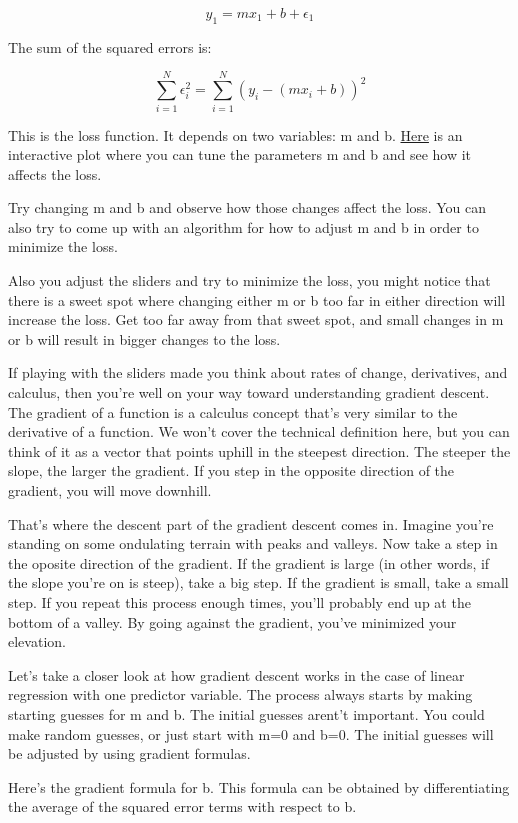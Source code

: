 \documentclass[11pt]{article}
\begin{document}
$$
y_1 = mx_1 + b + \epsilon_1
$$

The sum of the squared errors is:

$$
\sum_{i=1}^N \epsilon_i^2 = \sum_{i=1}^N (y_i - (mx_i + b))^2
$$

This is the loss function. It depends on two variables: m and b. \href{https://content.codecademy.com/programs/data-science-path/line-fitter/line-fitter.html}{Here} is an interactive plot where you can tune the parameters m and b and see how it affects the loss.

Try changing m and b and observe how those changes affect the loss. You can also try to come up with an algorithm for how to adjust m and b in order to minimize the loss.

Also you adjust the sliders and try to minimize the loss, you might notice that there is a sweet spot where changing either m or b too far in either direction will increase the loss. Get too far away from that sweet spot, and small changes in m or b will result in bigger changes to the loss.

If playing with the sliders made you think about rates of change, derivatives, and calculus, then you're well on your way toward understanding gradient descent. The gradient of a function is a calculus concept that's very similar to the derivative of a function. We won't cover the technical definition here, but you can think of it as a vector that points uphill in the steepest direction. The steeper the slope, the larger the gradient. If you step in the opposite direction of the gradient, you will move downhill.

That's where the descent part of the gradient descent comes in. Imagine you're standing on some ondulating terrain with peaks and valleys. Now take a step in the oposite direction of the gradient. If the gradient is large (in other words, if the slope you're on is steep), take a big step. If the gradient is small, take a small step. If you repeat this process enough times, you'll probably end up at the bottom of a valley. By going against the gradient, you've minimized your elevation.

Let's take a closer look at how gradient descent works in the case of linear regression with one predictor variable. The process always starts by making starting guesses for m and b. The initial guesses arent't important. You could make random guesses, or just start with m=0 and b=0. The initial guesses will be adjusted by using gradient formulas.

Here's the gradient formula for b. This formula can be obtained by differentiating the average of the squared error terms with respect to b.
\end{document}

